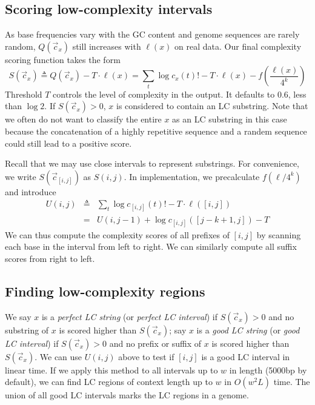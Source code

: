 \documentclass[webpdf,contemporary,large,namedate]{oup-authoring-template}%
\begin{document}
\subsection{Scoring low-complexity intervals}

As base frequencies vary with the GC content
and genome sequences are rarely random,
$Q(\vec{c}_x)$ still increases with $\ell(x)$ on real data.
Our final complexity scoring function takes the form
\begin{equation}\label{eq:S}
S(\vec{c}_x)\triangleq Q(\vec{c}_x)-T\cdot\ell(x)=\sum_t\log c_x(t)!-T\cdot\ell(x)-f\left(\frac{\ell(x)}{4^k}\right)
\end{equation}
Threshold $T$ controls the level of complexity in the output.
It defaults to $0.6$, less than $\log 2$.
If $S(\vec{c}_x)>0$, $x$ is considered to contain an LC substring.
Note that we often do not want to classify the entire $x$ as an LC substring in this case
because the concatenation of a highly repetitive sequence and a randem sequence
could still lead to a positive score.

Recall that we may use close intervals to represent substrings.
For convenience, we write $S(\vec{c}_{[i,j]})$ as $S(i,j)$.
In implementation, we precalculate $f(\ell/4^k)$ and introduce
\begin{eqnarray*}
U(i,j)&\triangleq&\sum_t\log c_{[i,j]}(t)!-T\cdot\ell([i,j])\\
&=&U(i,j-1)+\log c_{[i,j]}([j-k+1,j])-T
\end{eqnarray*}
We can thus compute the complexity scores of all prefixes of $[i,j]$
by scanning each base in the interval from left to right.
We can similarly compute all suffix scores from right to left.

\subsection{Finding low-complexity regions}

We say $x$ is a \emph{perfect LC string} (or \emph{perfect LC interval})
if $S(\vec{c}_x)>0$ and no substring of $x$ is scored higher than $S(\vec{c}_x)$;
say $x$ is a \emph{good LC string} (or \emph{good LC interval})
if $S(\vec{c}_x)>0$ and no prefix or suffix of $x$ is scored higher than $S(\vec{c}_x)$.
We can use $U(i,j)$ above to test if $[i,j]$ is a good LC interval in linear time.
If we apply this method to all intervals up to $w$ in length (5000bp by default),
we can find LC regions of context length up to $w$ in $O(w^2L)$ time.
The union of all good LC intervals marks the LC regions in a genome.
\end{document}
